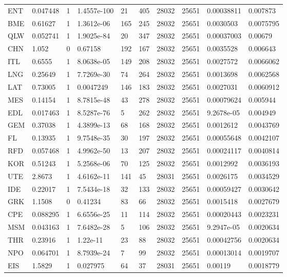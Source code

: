 {\begin{longtable}{llllllllll}
ENT & 0.047448 & 1 & 1.4557e-100 & 21 & 405 & 28032 & 25651 & 0.00038811 & 0.007873 \\ 
BME & 0.61627 & 1 & 1.3612e-06 & 165 & 245 & 28032 & 25651 & 0.0030503 & 0.0075795 \\ 
QLW & 0.052741 & 1 & 1.9025e-84 & 20 & 347 & 28032 & 25651 & 0.00037003 & 0.00679 \\ 
CHN & 1.052 & 0 & 0.67158 & 192 & 167 & 28032 & 25651 & 0.0035528 & 0.006643 \\ 
ITL & 0.6555 & 1 & 8.0638e-05 & 149 & 208 & 28032 & 25651 & 0.0027572 & 0.0066062 \\ 
LNG & 0.25649 & 1 & 7.7269e-30 & 74 & 264 & 28032 & 25651 & 0.0013698 & 0.0062568 \\ 
LAT & 0.73005 & 1 & 0.0047249 & 146 & 183 & 28032 & 25651 & 0.0027031 & 0.0060912 \\ 
MES & 0.14154 & 1 & 8.7815e-48 & 43 & 278 & 28032 & 25651 & 0.00079624 & 0.005944 \\ 
EDL & 0.017463 & 1 & 8.5287e-76 & 5 & 262 & 28032 & 25651 & 9.2678e-05 & 0.004949 \\ 
GEM & 0.37038 & 1 & 4.3899e-13 & 68 & 168 & 28032 & 25651 & 0.0012612 & 0.0043769 \\ 
FL & 0.13935 & 1 & 9.7548e-35 & 30 & 197 & 28032 & 25651 & 0.00055648 & 0.0042107 \\ 
RFD & 0.057468 & 1 & 4.9962e-50 & 13 & 207 & 28032 & 25651 & 0.00024117 & 0.0040814 \\ 
KOR & 0.51243 & 1 & 5.2568e-06 & 70 & 125 & 28032 & 25651 & 0.0012992 & 0.0036193 \\ 
UTE & 2.8673 & 1 & 4.6162e-11 & 141 & 45 & 28031 & 25651 & 0.0026175 & 0.0034529 \\ 
IDE & 0.22017 & 1 & 7.5434e-18 & 32 & 133 & 28032 & 25651 & 0.00059427 & 0.0030642 \\ 
GRK & 1.1508 & 0 & 0.41234 & 83 & 66 & 28032 & 25651 & 0.0015418 & 0.0027679 \\ 
CPE & 0.088295 & 1 & 6.6556e-25 & 11 & 114 & 28032 & 25651 & 0.00020443 & 0.0023231 \\ 
MSM & 0.043163 & 1 & 7.6482e-28 & 5 & 106 & 28032 & 25651 & 9.2947e-05 & 0.0020634 \\ 
THR & 0.23916 & 1 & 1.22e-11 & 23 & 88 & 28032 & 25651 & 0.00042756 & 0.0020634 \\ 
NPO & 0.064701 & 1 & 8.7939e-24 & 7 & 99 & 28032 & 25651 & 0.00013014 & 0.0019707 \\ 
EIS & 1.5829 & 1 & 0.027975 & 64 & 37 & 28031 & 25651 & 0.00119 & 0.0018779 \\ 

\end{longtable}}
